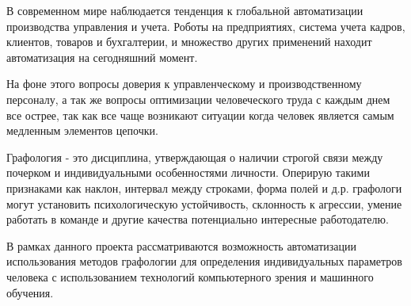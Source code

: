 \label{sec:intro}


В современном мире наблюдается тенденция к глобальной автоматизации производства управления и учета. Роботы на предприятиях, система учета кадров, клиентов, товаров и бухгалтерии, и множество других применений находит автоматизация на сегодняшний момент.

На фоне этого вопросы доверия к управленческому и производственному персоналу, а так же вопросы оптимизации человеческого труда с каждым днем все острее, так как все чаще возникают ситуации когда человек
является самым медленным элементов цепочки.

Графология - это дисциплина, утверждающая о наличии строгой связи между почерком и индивидуальными особенностями личности. Оперирую такими признаками как наклон, интервал между строками, форма полей и д.р. графологи могут установить психологическую устойчивость, склонность к агрессии, умение работать в команде и другие качества потенциально интересные работодателю. 

В рамках данного проекта рассматриваются возможность автоматизации использования методов графологии для определения индивидуальных параметров человека с использованием технологий компьютерного зрения и машинного обучения.